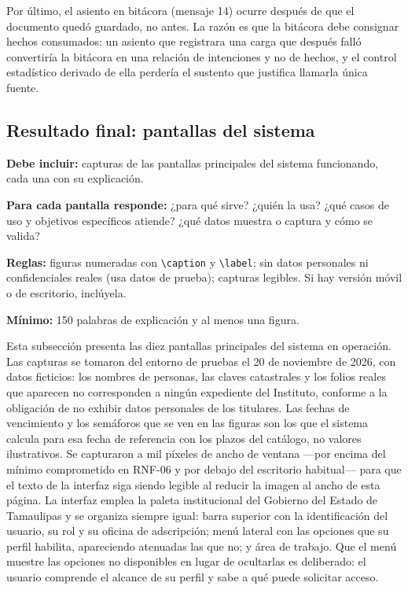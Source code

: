 Por último, el asiento en bitácora (mensaje 14) ocurre después de que el documento quedó guardado, no antes. La razón es que la bitácora debe consignar hechos consumados: un asiento que registrara una carga que después falló convertiría la bitácora en una relación de intenciones y no de hechos, y el control estadístico derivado de ella perdería el sustento que justifica llamarla única fuente.


\subsection{Resultado final: pantallas del sistema} \label{sec:pantallas} %

\begin{guia}
\textbf{Debe incluir:} capturas de las pantallas principales del sistema funcionando, cada una con su explicación.

\textbf{Para cada pantalla responde:} ¿para qué sirve? ¿quién la usa? ¿qué casos de uso y objetivos específicos
atiende? ¿qué datos muestra o captura y cómo se valida?

\textbf{Reglas:} figuras numeradas con \verb|\caption| y \verb|\label|; sin datos personales ni confidenciales reales
(usa datos de prueba); capturas legibles. Si hay versión móvil o de escritorio, inclúyela.

\textbf{Mínimo:} 150 palabras de explicación y al menos una figura.
\end{guia}

Esta subsección presenta las diez pantallas principales del sistema en operación. Las capturas se tomaron del entorno de pruebas el 20 de noviembre de 2026, con datos ficticios: los nombres de personas, las claves catastrales y los folios reales que aparecen no corresponden a ningún expediente del Instituto, conforme a la obligación de no exhibir datos personales de los titulares. Las fechas de vencimiento y los semáforos que se ven en las figuras son los que el sistema calcula para esa fecha de referencia con los plazos del catálogo, no valores ilustrativos. Se capturaron a mil píxeles de ancho de ventana —por encima del mínimo comprometido en RNF-06 y por debajo del escritorio habitual— para que el texto de la interfaz siga siendo legible al reducir la imagen al ancho de esta página. La interfaz emplea la paleta institucional del Gobierno del Estado de Tamaulipas y se organiza siempre igual: barra superior con la identificación del usuario, su rol y su oficina de adscripción; menú lateral con las opciones que su perfil habilita, apareciendo atenuadas las que no; y área de trabajo. Que el menú muestre las opciones no disponibles en lugar de ocultarlas es deliberado: el usuario comprende el alcance de su perfil y sabe a qué puede solicitar acceso.

